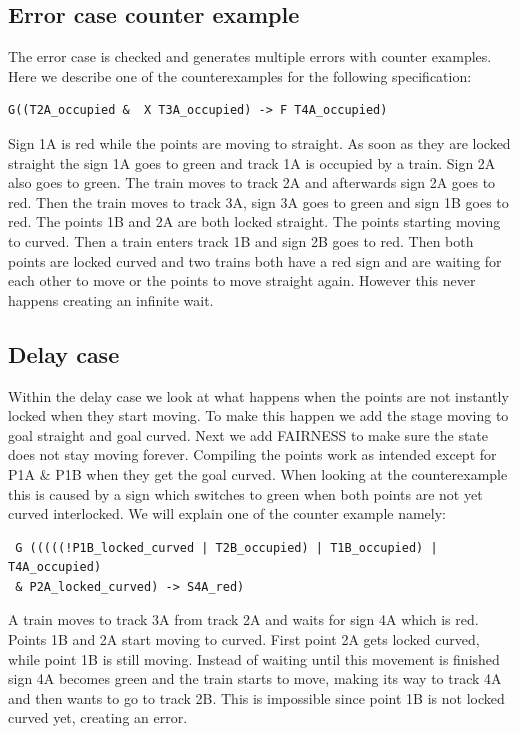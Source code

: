 \documentclass[a4paper]{article}
\begin{document}
	\subsection{Error case counter example}
	The error case is checked and generates multiple errors with counter examples. Here we describe one of the counterexamples for the following specification: 
	\begin{lstlisting}
G((T2A_occupied &  X T3A_occupied) -> F T4A_occupied)
	\end{lstlisting}
	Sign 1A is red while the points are moving to straight. As soon as they are locked straight the sign 1A goes to green and track 1A is occupied by a train. Sign 2A also goes to green. The train moves to track 2A and afterwards sign 2A goes to red. Then the train moves to track 3A, sign 3A goes to green and sign 1B goes to red. The points 1B and 2A are both locked straight. The points starting moving to curved. Then a train enters track 1B and sign 2B goes to red. Then both points are locked curved and two trains both have a red sign and are waiting for each other to move or the points to move straight again. However this never happens creating an infinite wait.	
	
	\subsection{Delay case}
	Within the delay case we look at what happens when the points are not instantly locked when they start moving. To make this happen we add the stage moving to goal straight and goal curved.
	Next we add FAIRNESS to make sure the state does not stay moving forever.
	Compiling the points work as intended except for P1A \& P1B when they get the goal curved. When looking at the counterexample this is caused by a sign which switches to green when both points are not yet curved interlocked.
	We will explain one of the counter example namely:
	\begin{lstlisting}
 G (((((!P1B_locked_curved | T2B_occupied) | T1B_occupied) | T4A_occupied)
 & P2A_locked_curved) -> S4A_red)
	\end{lstlisting}
	A train moves to track 3A from track 2A and waits for sign 4A which is red. Points 1B and 2A start moving to curved. First point 2A gets locked curved, while point 1B is still moving. Instead of waiting until this movement is finished sign 4A becomes green and the train starts to move, making its way to track 4A and then wants to go to track 2B. This is impossible since point 1B is not locked curved yet, creating an error. 
	
\end{document}
